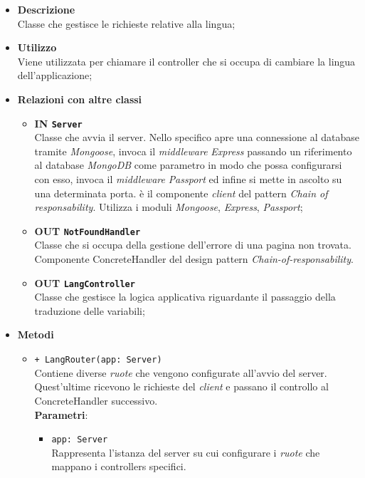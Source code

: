 	\begin{itemize}
		\item \textbf{Descrizione} \\
		Classe che gestisce le richieste relative alla lingua;
		\item \textbf{Utilizzo} \\
		Viene utilizzata per chiamare il controller che si occupa di cambiare la lingua dell'applicazione;
		\item \textbf{Relazioni con altre classi}
			\begin{itemize}
				\item \textbf{IN \texttt{Server}} \\
				Classe che avvia il server. Nello specifico apre una connessione al database tramite \textit{Mongoose}, invoca il \textit{middleware} \textit{Express} passando un riferimento al database \textit{MongoDB} come parametro in modo che possa configurarsi con esso, invoca il \textit{middleware} \textit{Passport} ed infine si mette in ascolto su una determinata porta. è il componente \textit{client} del pattern \textit{Chain of responsability}. Utilizza i moduli \textit{Mongoose}, \textit{Express}, \textit{Passport};
				\item \textbf{OUT \texttt{NotFoundHandler}} \\
				Classe che si occupa della gestione dell'errore di una pagina non trovata. Componente ConcreteHandler del design pattern \textit{Chain-of-responsability}.
				\item \textbf{OUT \texttt{LangController}} \\
					Classe che gestisce la logica applicativa riguardante il passaggio della traduzione delle variabili;
			\end{itemize}
		\item \textbf{Metodi}
			\begin{itemize}
				\item \texttt{+ LangRouter(app: Server)} \\
				Contiene diverse \textit{ruote} che vengono configurate all'avvio del server. Quest'ultime ricevono le richieste del \textit{client} e passano il controllo al ConcreteHandler successivo. \\
				\textbf{Parametri}:
					\begin{itemize}
						\item \texttt{app: Server} \\
						Rappresenta l'istanza del server su cui configurare i \textit{ruote} che mappano i controllers specifici.
					\end{itemize}
			\end{itemize}
	\end{itemize}